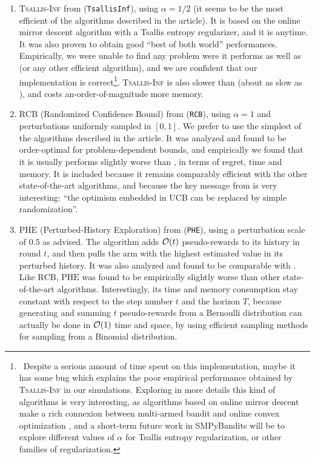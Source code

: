 \begin{enumerate}
    \item
    \textsc{Tsallis-Inf} from \cite{Zimmert2018} (\texttt{TsallisInf}), using $\alpha=1/2$ (it seems to be the most efficient of the algorithms described in the article).
    It is based on the online mirror descent algorithm with a Tsallis entropy regularizer, and it is anytime.
    It was also proven to obtain good ``best of both world'' performances.
    Empirically, we were unable to find any problem were it performs as well as \UCB{} (or any other efficient algorithm), and we are confident that our implementation is correct\footnote{~Despite a serious amount of time spent on this implementation, maybe it has some bug which explains the poor empirical performance obtained by \textsc{Tsallis-Inf} in our simulations. Exploring in more details this kind of algorithms is very interesting, as algorithms based on online mirror descent make a rich connexion between multi-armed bandit and online convex optimization \cite{Hazan2016introduction}, and a short-term future work in SMPyBandits will be to explore different values of $\alpha$ for Tsallis entropy regularization, or other families of regularization.}.
    \textsc{Tsallis-Inf} is also slower than \UCB{} (about as slow as \KLUCBswitch), and costs an-order-of-magnitude more memory.

    \item
    $\mathrm{RCB}$ (Randomized Confidence Bound) from \cite{KimTewari2019} (\texttt{RCB}), using $\alpha=1$ and perturbations uniformly sampled in $[0,1]$. We prefer to use the simplest of the algorithms described in the article.
    It was analyzed and found to be order-optimal for problem-dependent bounds, and empirically we found that it is usually performs slightly worse than \UCB, in terms of regret, time and memory.
    It is included because it remains comparably efficient with the other state-of-the-art algorithms, and because the key message from \cite{KimTewari2019} is very interesting:
    ``the optimism embedded in UCB can be replaced by simple randomization''.

    \item
    $\mathrm{PHE}$ (Perturbed-History Exploration) from \cite{KvetonSzepesvari2019} (\texttt{PHE}), using a perturbation scale of $0.5$ as advised.
    The algorithm adds $\mathcal{O}(t)$ \iid{} pseudo-rewards to its history in round $t$, and then pulls the arm with the highest estimated value in its perturbed history.
    It was also analyzed and found to be comparable with \UCB.
    Like $\mathrm{RCB}$, $\mathrm{PHE}$ was found to be empirically slightly worse than other state-of-the-art algorithms.
    Interestingly, its time and memory consumption stay constant with respect to the step number $t$ and the horizon $T$, because generating and summing $t$ pseudo-rewards from a Bernoulli distribution can actually be done in $\mathcal{O}(1)$ time and space, by using efficient sampling methods for sampling from a Binomial distribution.
\end{enumerate}

